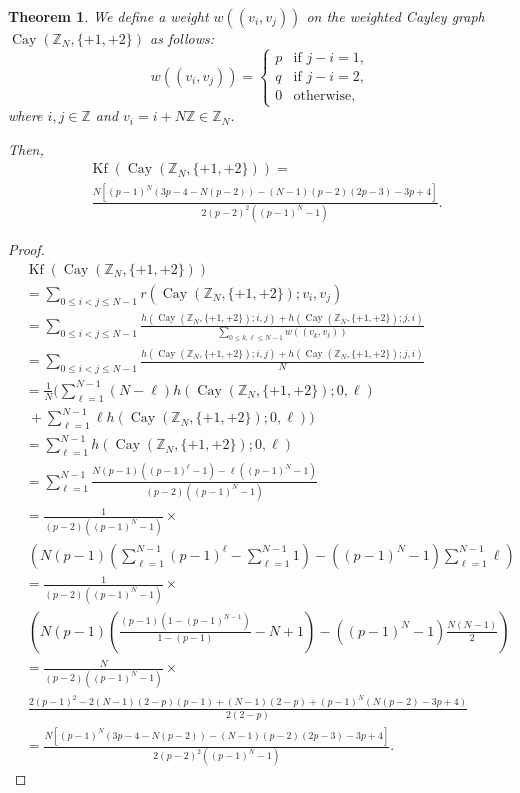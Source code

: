\documentclass[12pt, leqno]{amsart}
\numberwithin{equation}{section}
\theoremstyle{plain}
\newtheorem{thm}{Theorem}[section]
\theoremstyle{definition}
\newcommand{\ZZ}{\mathbb{Z}}
\newcommand{\0}{\mathbf{0}}
\DeclareMathOperator{\Cay}{Cay}
\DeclareMathOperator{\Kf}{Kf}
\begin{document}
\begin{thm}
We define a weight $w((v_i,v_j))$ on the weighted Cayley graph $\Cay(\ZZ_N,\{+1,+2\})$ as follows: 
\[
w((v_i,v_j))=
\begin{cases}
p &\text{if $j-i=1$,}\\
q &\text{if $j-i=2$,}\\
0 &\text{otherwise,}
\end{cases}
\]
where $i,j\in \ZZ$ and $v_i=i+N\ZZ\in\ZZ_N$.

Then, %
\begin{align*}
&\Kf(\Cay(\ZZ_N,\{+1,+2\}))= \\
&~\frac{N\left[ (p-1)^N(3p-4-N(p-2))-(N-1)(p-2)(2p-3)-3p+4 \right]}{2(p-2)^2((p-1)^N-1)}.
\end{align*}
\end{thm}

\begin{proof}

\begin{align*}
&\Kf(\Cay(\ZZ_N,\{+1,+2\})) \\
&=\sum_{0\leq i<j\leq N-1}r(\Cay(\ZZ_N,\{+1,+2\});v_i,v_j) \\
&=\sum_{0\leq i<j\leq N-1}\frac{h(\Cay(\ZZ_N,\{+1,+2\});i,j)+h(\Cay(\ZZ_N,\{+1,+2\});j,i)}{\sum_{0\leq k,\ell\leq N-1}w((v_k,v_\ell))} \\
&=\sum_{0\leq i<j\leq N-1}\frac{h(\Cay(\ZZ_N,\{+1,+2\});i,j)+h(\Cay(\ZZ_N,\{+1,+2\});j,i)}{N} \\
&=\frac{1}{N}( \sum_{\ell=1}^{N-1}(N-\ell)h(\Cay(\ZZ_N,\{+1,+2\});0,\ell) \\
&~+\sum_{\ell=1}^{N-1}\ell h(\Cay(\ZZ_N,\{+1,+2\});0,\ell) ) \\
&=\sum_{\ell=1}^{N-1}h(\Cay(\ZZ_N,\{+1,+2\});0,\ell) \\
&=\sum_{\ell=1}^{N-1}\frac{N(p-1)((p-1)^\ell-1)-\ell((p-1)^N-1)}{(p-2)((p-1)^N-1)} \\
&=\frac{1}{(p-2)((p-1)^N-1)} \times \\
&~\left( N(p-1)(\sum_{\ell=1}^{N-1}(p-1)^\ell-\sum_{\ell=1}^{N-1}1)-((p-1)^N-1)\sum_{\ell=1}^{N-1}\ell \right) \\
&=\frac{1}{(p-2)((p-1)^N-1)} \times \\
&~\left( N(p-1)(\frac{(p-1)(1-(p-1)^{N-1})}{1-(p-1)}-N+1)-((p-1)^N-1)\frac{N(N-1)}{2} \right) \\
&=\frac{N}{(p-2)((p-1)^N-1)} \times \\
&~\frac{2(p-1)^2-2(N-1)(2-p)(p-1)+(N-1)(2-p)+(p-1)^N(N(p-2)-3p+4)}{2(2-p)} \\
&=\frac{N\left[ (p-1)^N(3p-4-N(p-2))-(N-1)(p-2)(2p-3)-3p+4 \right]}{2(p-2)^2((p-1)^N-1)}.
\end{align*}

\end{proof}
\end{document}
